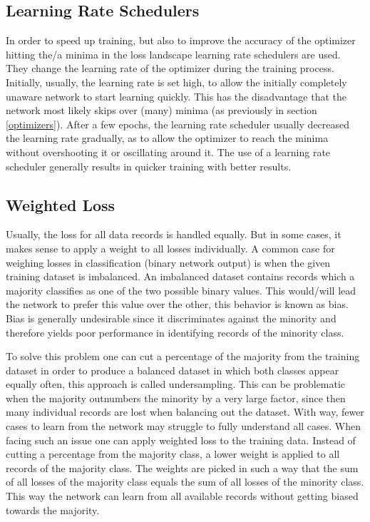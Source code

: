 \documentclass[a4paper,10pt]{scrartcl}
\begin{document}
\subsection{Learning Rate Schedulers}

In order to speed up training, but also to improve the accuracy of the optimizer hitting the/a minima in the loss landscape learning rate schedulers are used.
They change the learning rate of the optimizer during the training process.
Initially, usually, the learning rate is set high, to allow the initially completely unaware network to start learning quickly.
This has the disadvantage that the network most likely skips over (many) minima (as previously in section \ref{optimizers}).
After a few epochs, the learning rate scheduler usually decreased the learning rate gradually, as to allow the optimizer to reach the minima without overshooting it or oscillating around it.
The use of a learning rate scheduler generally results in quicker training with better results.


\subsection{Weighted Loss}
\label{weighted-loss}

Usually, the loss for all data records is handled equally.
But in some cases, it makes sense to apply a weight to all losses individually.
A common case for weighing losses in classification (binary network output) is when the given training dataset is imbalanced.
An imbalanced dataset contains records which a majority classifies as one of the two possible binary values.
This would/will lead the network to prefer this value over the other, this behavior is known as bias.
Bias is generally undesirable since it discriminates against the minority and therefore yields poor performance in identifying records of the minority class.

To solve this problem one can cut a percentage of the majority from the training dataset in order to produce a balanced dataset in which both classes appear equally often, this approach is called undersampling.
This can be problematic when the majority outnumbers the minority by a very large factor, since then many individual records are lost when balancing out the dataset.
With way, fewer cases to learn from the network may struggle to fully understand all cases.
When facing such an issue one can apply weighted loss to the training data.
Instead of cutting a percentage from the majority class, a lower weight is applied to all records of the majority class.
The weights are picked in such a way that the sum of all losses of the majority class equals the sum of all losses of the minority class.
This way the network can learn from all available records without getting biased towards the majority.
\end{document}
